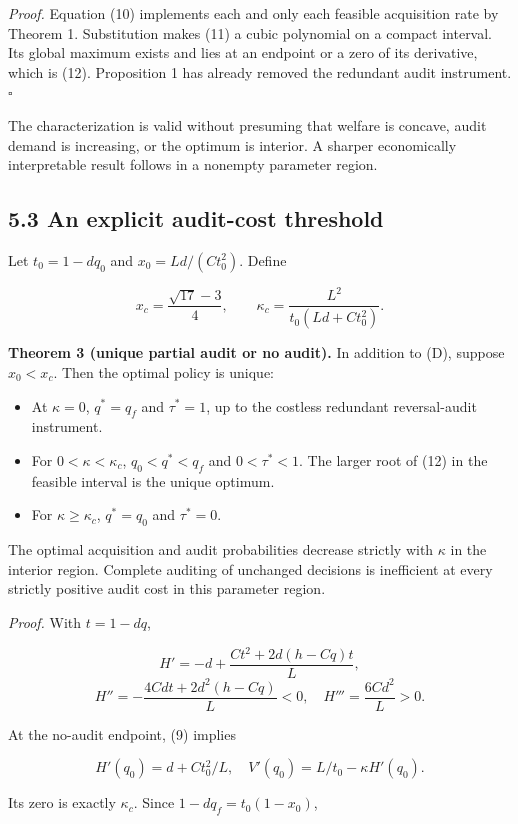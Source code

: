 \documentclass[
  11pt,
]{article}
\providecommand{\tightlist}{%
  \setlength{\itemsep}{0pt}\setlength{\parskip}{0pt}}
\begin{document}
\emph{Proof.} Equation (10) implements each and only each feasible
acquisition rate by Theorem 1. Substitution makes (11) a cubic
polynomial on a compact interval. Its global maximum exists and lies at
an endpoint or a zero of its derivative, which is (12). Proposition 1
has already removed the redundant audit instrument. \(\square\)

The characterization is valid without presuming that welfare is concave,
audit demand is increasing, or the optimum is interior. A sharper
economically interpretable result follows in a nonempty parameter
region.

\subsection{5.3 An explicit audit-cost
threshold}\label{an-explicit-audit-cost-threshold}

Let \(t_0=1-dq_0\) and \(x_0=Ld/(Ct_0^2)\). Define

\[x_c=\frac{\sqrt{17}-3}{4},\qquad
\kappa_c=\frac{L^2}{t_0(Ld+Ct_0^2)}.\tag{13}\]

\textbf{Theorem 3 (unique partial audit or no audit).} In addition to
(D), suppose \(x_0<x_c\). Then the optimal policy is unique:

\begin{itemize}
\tightlist
\item
  At \(\kappa=0\), \(q^*=q_f\) and \(\tau^*=1\), up to the costless
  redundant reversal-audit instrument.
\item
  For \(0<\kappa<\kappa_c\), \(q_0<q^*<q_f\) and \(0<\tau^*<1\). The
  larger root of (12) in the feasible interval is the unique optimum.
\item
  For \(\kappa\geq\kappa_c\), \(q^*=q_0\) and \(\tau^*=0\).
\end{itemize}

The optimal acquisition and audit probabilities decrease strictly with
\(\kappa\) in the interior region. Complete auditing of unchanged
decisions is inefficient at every strictly positive audit cost in this
parameter region.

\emph{Proof.} With \(t=1-dq\),

\[H'=-d+\frac{Ct^2+2d(h-Cq)t}{L},\]
\[H''=-\frac{4Cd t+2d^2(h-Cq)}{L}<0,\quad H'''=\frac{6Cd^2}{L}>0.\tag{14}\]

At the no-audit endpoint, (9) implies

\[H'(q_0)=d+Ct_0^2/L,\quad V'(q_0)=L/t_0-\kappa H'(q_0).\]

Its zero is exactly \(\kappa_c\). Since \(1-dq_f=t_0(1-x_0)\),
\end{document}
